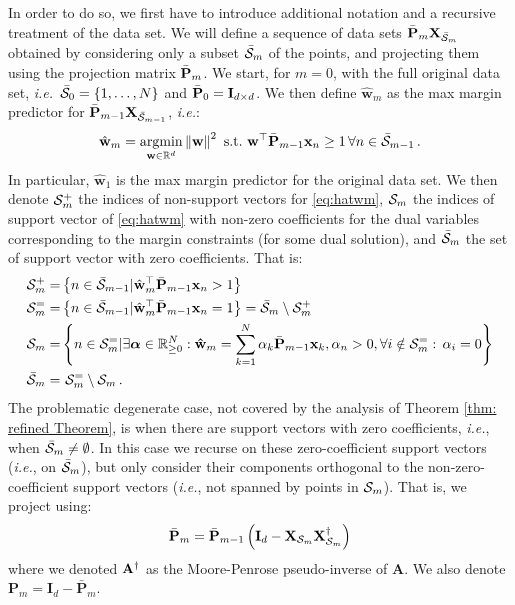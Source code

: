\documentclass[twoside,11pt,english]{article}
\begin{document}
In order to do so, we first have to introduce additional notation and a recursive treatment of the data set.  We will define a sequence of data sets $\bar{\mathbf{P}}_m \mathbf{X}_{\bar{\mathcal{S}}_m}$ obtained by considering only a subset $\bar{\mathcal{S}}_m$ of the points, and projecting them using the projection matrix $\bar{\mathbf{P}}_m$.  We start, for $m=0$, with the full original data set, \emph{i.e.}~$\bar{\mathcal{S}}_0=\{1,\ldots,N\}$ and $\bar{\mathbf{P}}_0=\mathbf{I}_{d \times d}$.  We then define $\hat{\mathbf{w}}_m$ as the max margin predictor for $\bar{\mathbf{P}}_{m-1} \mathbf{X}_{\bar{\mathcal{S}}_{m-1}}$, \emph{i.e.}:
\begin{equation}\label{eq:hatwm}
\hat{\mathbf{w}}_{m}=\underset{\mathbf{\mathbf{w}}\in\mathbb{R}^{d}}{\mathrm{argmin}}\left\lVert \mathbf{w}\right\rVert ^{2}\,\,\mathrm{s.t.}\,\,\mathbf{w}^{\top}\bar{\mathcal{\mathbf{P}}}_{m-1}\mathbf{x}_{n}\geq1\,\forall n\in\bar{\mathcal{S}}_{m-1}\,.
\end{equation}
In particular, $\hat{\mathbf{w}}_1$ is the max margin predictor for the original data set.  We then denote $\mathcal{S}_m^+$ the indices of non-support vectors for \ref{eq:hatwm}, $\mathcal{S}_m$ the indices of support vector of \ref{eq:hatwm} with non-zero coefficients for the dual variables corresponding to the margin constraints (for some dual solution), and $\bar{\mathcal{S}}_m$ the set of support vector with zero coefficients.  That is:
\begin{align}\label{eq:sm}
\mathcal{S}_{m}^{+}= & \left\{ n\in\bar{\mathcal{S}}_{m-1}|\hat{\mathbf{w}}_{m}^{\top}\bar{\mathcal{\mathbf{P}}}_{m-1}\mathbf{x}_{n}>1\right\} \nonumber\\
\mathcal{S}_{m}^{=}= & \left\{ n\in\bar{\mathcal{S}}_{m-1}|\hat{\mathbf{w}}_{m}^{\top}\bar{\mathcal{\mathbf{P}}}_{m-1}\mathbf{x}_{n}=1\right\} =\bar{\mathcal{S}}_{m}\setminus\mathcal{S}_{m}^{+}\nonumber\\
\mathcal{S}_{m}= & \left\{ n\in\mathcal{S}_{m}^{=}|\exists\boldsymbol{\alpha}\in\mathbb{R}_{\geq0}^{N}:\mathbf{\hat{w}}_{m}=\sum_{k=1}^{N}\alpha_{k}\bar{\mathcal{\mathbf{P}}}_{m-1}\mathbf{x}_{k},\alpha_{n}>0,\forall i\notin\mathcal{S}_{m}^{=}:\,\alpha_{i}=0\right\} \nonumber\\
\bar{\mathcal{S}}_{m}= &\, \, \mathcal{S}_{m}^{=} \setminus\mathcal{S}_{m}\,.
\end{align}
The problematic degenerate case, not covered by the analysis of Theorem \ref{thm: refined Theorem}, is when there are support vectors with zero coefficients, \emph{i.e.}, when $\bar{\mathcal{S}}_m\neq\emptyset$.  In this case we recurse on these zero-coefficient support vectors (\emph{i.e.}, on $\bar{\mathcal{S}}_m$), but only consider their components orthogonal to the non-zero-coefficient support vectors (\emph{i.e.}, not spanned by points in $\mathcal{S}_m$).  That is, we project using:
\begin{equation}
    \bar{\mathbf{P}}_{m}=\bar{\mathbf{P}}_{m-1}\left(\mathbf{I}_{d}-\mathbf{X}_{\mathcal{S}_{m}}\mathbf{X}_{\mathcal{S}_{m}}^{\dagger}\right)
\end{equation}
where we denoted $\mathbf{A}^{\dagger}$ as the Moore-Penrose pseudo-inverse 
of $\mathbf{A}$. We also denote $\mathbf{P}_{m}  =\mathbf{I}_{d}-\bar{\mathbf{P}}_{m}$.  
\end{document}
